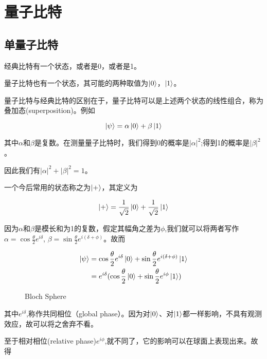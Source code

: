 \section{量子比特}

\subsection{单量子比特}

经典比特有一个状态，或者是0，或者是1。

量子比特也有一个状态，其可能的两种取值为$\ket{0}$，$\ket{1}$。

量子比特与经典比特的区别在于，量子比特可以是上述两个状态的线性组合，称为叠加态(superposition)。例如

\begin{equation}
\ket{\psi} = \alpha\ket{0} + \beta\ket{1}
\end{equation}

其中$\alpha$和$\beta$是复数。在测量量子比特时，我们得到0的概率是$|\alpha|^2$;得到1的概率是$|\beta|^2$。

因此我们有$|\alpha|^2 + |\beta|^2 = 1$。

一个今后常用的状态称之为$\ket{+}$，其定义为

\begin{equation}
\ket{+} = \frac{1}{\sqrt{2}}\ket{0} + \frac{1}{\sqrt{2}}\ket{1}
\end{equation}

因为$\alpha$和$\beta$是模长和为1的复数，假定其幅角之差为$\phi$,我们就可以将两者写作$\alpha = \cos\frac{\theta}{2}e^{i\delta}$, $\beta = \sin\frac{\theta}{2}e^{i(\delta + \phi)}$。故而

\begin{equation}
\begin{aligned}
\ket{\psi} &= \cos\frac{\theta}{2}e^{i\delta}\ket{0} + \sin\frac{\theta}{2}e^{i(\delta + \phi)}\ket{1} \\
&= e^{i\delta}(\cos\frac{\theta}{2}\ket{0} + \sin\frac{\theta}{2}e^{i\phi}\ket{1})
\end{aligned}
\end{equation}

\begin{figure}
  \centering
  
  \caption{Bloch Sphere}
\end{figure}

其中$e^{i\delta}$,称作共同相位（global phase）。因为对$\ket{0}$、对$\ket{1}$都一样影响，不具有观测效应，故可以将之舍弃不看。

至于相对相位(relative phase)$e^{i\phi}$,就不同了，它的影响可以在球面上表现出来。故得

